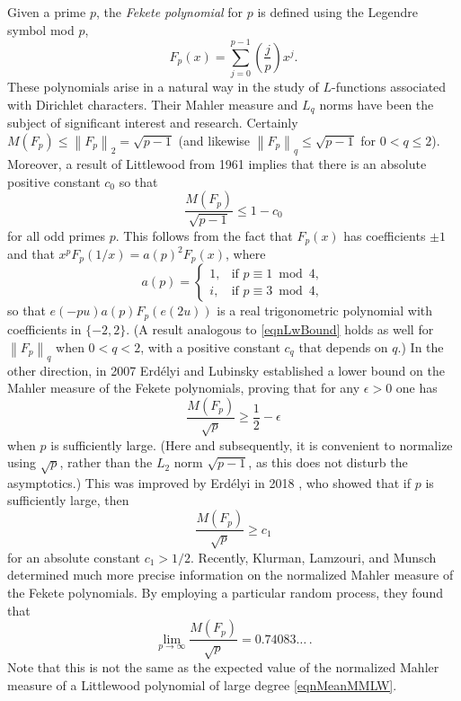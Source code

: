 \documentclass[reqno]{amsart}
\numberwithin{equation}{section}
\numberwithin{table}{section}
\numberwithin{figure}{section}
\newcommand{\leg}[2]{\left(\frac{#1}{#2}\right)}
\newcommand{\dbars}[1]{\left\lVert#1\right\rVert}
\begin{document}
Given a prime $p$, the \textit{Fekete polynomial} for $p$ is defined using the Legendre symbol mod $p$,
\[
F_p(x) = \sum_{j=0}^{p-1} \leg{j}{p} x^j.
\]
These polynomials arise in a natural way in the study of $L$-functions associated with Dirichlet characters.
Their Mahler measure and $L_q$ norms have been the subject of significant interest and research.
Certainly $M(F_p) \leq \dbars{F_p}_2 = \sqrt{p-1}$ (and likewise $\dbars{F_p}_q \leq \sqrt{p-1}$ for $0<q\leq 2$).
Moreover, a result of Littlewood from 1961 \cite{Littlewood61} implies that there is an absolute positive constant $c_0$ so that
\begin{equation}\label{eqnLwBound}
\frac{M(F_p)}{\sqrt{p-1}} \leq 1 - c_0
\end{equation}
for all odd primes $p$.
This follows from the fact that $F_p(x)$ has coefficients $\pm1$ and that $x^p F_p(1/x) = a(p)^2 F_p(x)$, where
\begin{equation}\label{eqnap}
a(p) = \begin{cases}
1, & \textrm{if $p\equiv1\bmod 4$},\\
i, & \textrm{if $p\equiv3\bmod 4$},
\end{cases}
\end{equation}
so that $e(-pu) a(p) F_p(e(2u))$ is a real trigonometric polynomial with coefficients in $\{-2,2\}$.
(A result analogous to \eqref{eqnLwBound} holds as well for $\dbars{F_p}_q$ when $0<q<2$, with a positive constant $c_q$ that depends on $q$.)
In the other direction, in 2007 Erd\'elyi and Lubinsky \cite{EL07} established a lower bound on the Mahler measure of the Fekete polynomials, proving that for any $\epsilon>0$ one has
\[
\frac{M(F_p)}{\sqrt{p}} \geq \frac{1}{2} - \epsilon
\]
when $p$ is sufficiently large.
(Here and subsequently, it is convenient to normalize using $\sqrt{p}$, rather than the $L_2$ norm $\sqrt{p-1}$, as this does not disturb the asymptotics.)
This was improved by Erd\'elyi in 2018 \cite{Erdelyi18}, who showed that if $p$ is sufficiently large, then
\[
\frac{M(F_p)}{\sqrt{p}} \geq c_1
\]
for an absolute constant $c_1>1/2$.
Recently, Klurman, Lamzouri, and Munsch \cite{KLM23} determined much more precise information on the normalized Mahler measure of the Fekete polynomials.
By employing a particular random process, they found that
\begin{equation}\label{eqnKLM}
\lim_{p\to\infty} \frac{M(F_p)}{\sqrt{p}} = 0.74083\ldots\,.
\end{equation}
Note that this is not the same as the expected value of the normalized Mahler measure of a Littlewood polynomial of large degree \eqref{eqnMeanMMLW}.
\end{document}
